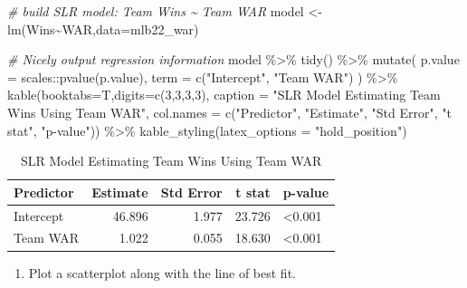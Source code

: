 \documentclass[
  11pt,
]{book}
\newenvironment{Shaded}{\begin{snugshade}}{\end{snugshade}}
\newcommand{\AttributeTok}[1]{\textcolor[rgb]{0.77,0.63,0.00}{#1}}
\newcommand{\CommentTok}[1]{\textcolor[rgb]{0.56,0.35,0.01}{\textit{#1}}}
\newcommand{\DecValTok}[1]{\textcolor[rgb]{0.00,0.00,0.81}{#1}}
\newcommand{\FunctionTok}[1]{\textcolor[rgb]{0.00,0.00,0.00}{#1}}
\newcommand{\NormalTok}[1]{#1}
\newcommand{\OtherTok}[1]{\textcolor[rgb]{0.56,0.35,0.01}{#1}}
\newcommand{\SpecialCharTok}[1]{\textcolor[rgb]{0.00,0.00,0.00}{#1}}
\newcommand{\StringTok}[1]{\textcolor[rgb]{0.31,0.60,0.02}{#1}}
\providecommand{\tightlist}{%
  \setlength{\itemsep}{0pt}\setlength{\parskip}{0pt}}
\theoremstyle{definition}
\theoremstyle{definition}
\theoremstyle{definition}
\theoremstyle{definition}
\theoremstyle{remark}
\begin{document}
\begin{Shaded}
\begin{Highlighting}[]
\CommentTok{\# build SLR model: Team Wins \textasciitilde{} Team WAR}
\NormalTok{model }\OtherTok{\textless{}{-}} \FunctionTok{lm}\NormalTok{(Wins}\SpecialCharTok{\textasciitilde{}}\NormalTok{WAR,}\AttributeTok{data=}\NormalTok{mlb22\_war)}

\CommentTok{\# Nicely output regression information}
\NormalTok{model }\SpecialCharTok{\%\textgreater{}\%} \FunctionTok{tidy}\NormalTok{() }\SpecialCharTok{\%\textgreater{}\%}
  \FunctionTok{mutate}\NormalTok{(}
    \AttributeTok{p.value =}\NormalTok{ scales}\SpecialCharTok{::}\FunctionTok{pvalue}\NormalTok{(p.value),}
    \AttributeTok{term =} \FunctionTok{c}\NormalTok{(}\StringTok{"Intercept"}\NormalTok{, }\StringTok{"Team WAR"}\NormalTok{)}
\NormalTok{  ) }\SpecialCharTok{\%\textgreater{}\%}
  \FunctionTok{kable}\NormalTok{(}\AttributeTok{booktabs=}\NormalTok{T,}\AttributeTok{digits=}\FunctionTok{c}\NormalTok{(}\DecValTok{3}\NormalTok{,}\DecValTok{3}\NormalTok{,}\DecValTok{3}\NormalTok{,}\DecValTok{3}\NormalTok{), }
        \AttributeTok{caption =} \StringTok{"SLR Model Estimating Team Wins Using Team WAR"}\NormalTok{,}
        \AttributeTok{col.names =} \FunctionTok{c}\NormalTok{(}\StringTok{"Predictor"}\NormalTok{, }\StringTok{"Estimate"}\NormalTok{, }\StringTok{"Std Error"}\NormalTok{, }\StringTok{"t stat"}\NormalTok{, }\StringTok{"p{-}value"}\NormalTok{)) }\SpecialCharTok{\%\textgreater{}\%}
  \FunctionTok{kable\_styling}\NormalTok{(}\AttributeTok{latex\_options =} \StringTok{"hold\_position"}\NormalTok{)}
\end{Highlighting}
\end{Shaded}

\begin{table}[!h]

\caption{\label{tab:unnamed-chunk-199}SLR Model Estimating Team Wins Using Team WAR}
\centering
\begin{tabular}[t]{lrrrl}
\toprule
Predictor & Estimate & Std Error & t stat & p-value\\
\midrule
Intercept & 46.896 & 1.977 & 23.726 & <0.001\\
Team WAR & 1.022 & 0.055 & 18.630 & <0.001\\
\bottomrule
\end{tabular}
\end{table}

\newpage

\begin{enumerate}
\def\labelenumi{(\alph{enumi})}
\setcounter{enumi}{2}
\tightlist
\item
  Plot a scatterplot along with the line of best fit.
\end{enumerate}
\end{document}
